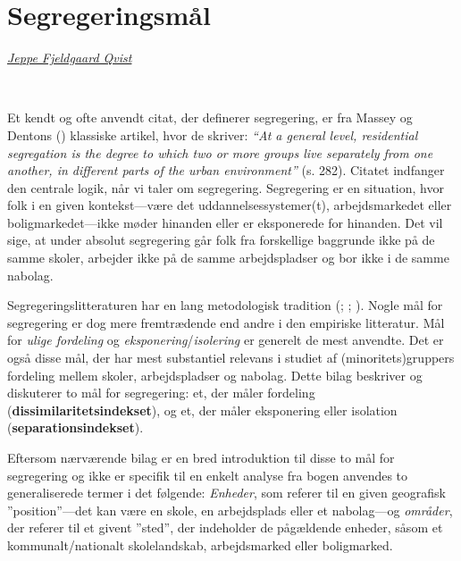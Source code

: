 \documentclass[
]{book}
\begin{document}
\appendix


\chapter{Segregeringsmål}\label{bilag1}

\thispagestyle{empty}

\emph{\href{https://vbn.aau.dk/da/persons/jeppefl}{Jeppe Fjeldgaard Qvist}}

~~~~

Et kendt og ofte anvendt citat, der definerer segregering, er fra Massey og Dentons () klassiske artikel, hvor de skriver: \emph{``At a general level, residential segregation is the degree to which two or more groups live separately from one another, in different parts of the urban environment''} (s. 282). Citatet indfanger den centrale logik, når vi taler om segregering. Segregering er en situation, hvor folk i en given kontekst---være det uddannelsessystemer(t), arbejdsmarkedet eller boligmarkedet---ikke møder hinanden eller er eksponerede for hinanden. Det vil sige, at under absolut segregering går folk fra forskellige baggrunde ikke på de samme skoler, arbejder ikke på de samme arbejdspladser og bor ikke i de samme nabolag.

Segregeringslitteraturen har en lang metodologisk tradition (; ; ). Nogle mål for segregering er dog mere fremtrædende end andre i den empiriske litteratur. Mål for \emph{ulige fordeling} og \emph{eksponering}/\emph{isolering} er generelt de mest anvendte. Det er også disse mål, der har mest substantiel relevans i studiet af (minoritets)gruppers fordeling mellem skoler, arbejdspladser og nabolag. Dette bilag beskriver og diskuterer to mål for segregering: et, der måler fordeling (\textbf{dissimilaritetsindekset}), og et, der måler eksponering eller isolation (\textbf{separationsindekset}).

Eftersom nærværende bilag er en bred introduktion til disse to mål for segregering og ikke er specifik til en enkelt analyse fra bogen anvendes to generaliserede termer i det følgende: \emph{Enheder}, som referer til en given geografisk ''position''---det kan være en skole, en arbejdsplads eller et nabolag---og \emph{områder}, der referer til et givent ''sted'', der indeholder de pågældende enheder, såsom et kommunalt/nationalt skolelandskab, arbejdsmarked eller boligmarked.
\end{document}

